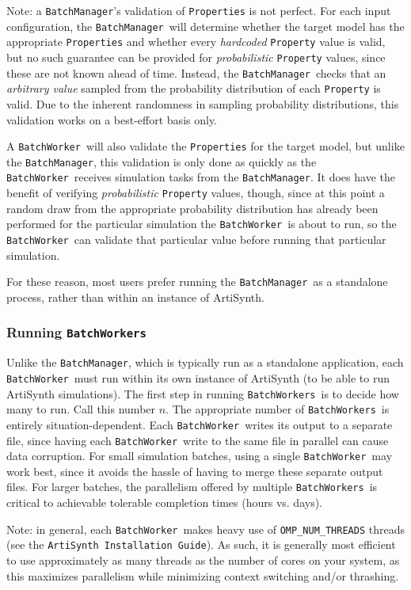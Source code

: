 \documentclass{article}
\newcommand{\BM}{{\tt BatchManager}}
\newcommand{\BW}{{\tt BatchWorker}}
\newcommand{\BWs}{{\tt BatchWorkers}}
\begin{document}
\begin{sideblock}
Note: a \BM's validation of {\tt Properties} is not perfect. For each input configuration, the \BM\ will determine whether the target model has the appropriate {\tt Properties} and whether every \textit{hardcoded} {\tt Property} value is valid, but no such guarantee can be provided for \textit{probabilistic} {\tt Property} values, since these are not known ahead of time. Instead, the \BM\ checks that an \textit{arbitrary value} sampled from the probability distribution of each {\tt Property} is valid. Due to the inherent randomness in sampling probability distributions, this validation works on a best-effort basis only.

A \BW\ will also validate the {\tt Properties} for the target model, but unlike the \BM, this validation is only done as quickly as the \BW\ receives simulation tasks from the \BM. It does have the benefit of verifying \textit{probabilistic} {\tt Property} values, though, since at this point a random draw from the appropriate probability distribution has already been performed for the particular simulation the \BW\ is about to run, so the \BW\ can validate that particular value before running that particular simulation.

For these reason, most users prefer running the \BM\ as a standalone process, rather than within an instance of ArtiSynth.
\end{sideblock}

\subsubsection{Running \BWs}

Unlike the \BM, which is typically run as a standalone application, each \BW\ must run within its own instance of ArtiSynth (to be able to run ArtiSynth simulations). The first step in running \BWs\ is to decide how many to run. Call this number $n$. The appropriate number of \BWs\ is entirely situation-dependent. Each \BW\ writes its output to a separate file, since having each \BW\ write to the same file in parallel can cause data corruption. For small simulation batches, using a single \BW\ may work best, since it avoids the hassle of having to merge these separate output files. For larger batches, the parallelism offered by multiple \BWs\ is critical to achievable tolerable completion times (hours vs. days).

\begin{sideblock}
Note: in general, each \BW\ makes heavy use of {\tt OMP\_NUM\_THREADS} threads (see the {\tt ArtiSynth Installation Guide}). As such, it is generally most efficient to use approximately as many threads as the number of cores on your system, as this maximizes parallelism while minimizing context switching and/or thrashing.
\end{sideblock}
\end{document}
